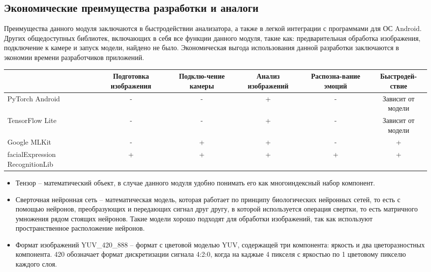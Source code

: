 \documentclass[a4paper,12pt]{article}
\begin{document}
    \subsection{Экономические преимущества разработки и аналоги}
    Преимущества данного модуля заключаются в быстродействии анализатора, а также в легкой интеграции с программами для ОС Android.
    Других общедоступных библиотек, включающих в себя все функции данного модуля, такие как: предварительная обработка изображения, подключение к камере и запуск модели, найдено не было.
    Экономическая выгода использования данной разработки заключаются в экономии времени разработчиков приложений.
    \\

    \noindent
    \begin{tabular}{| l | c | c | c | c | c |}
        \hline
        & \parbox[c][2cm][c]{2.2cm}{\centering Подготовка изображения}
        & \parbox[c][2cm][c]{2.2cm}{\centering Подклю-чение камеры}
        & \parbox[c][2cm][c]{2.2cm}{\centering Анализ изображений}
        & \parbox[c][2cm][c]{2.2cm}{\centering Распозна-вание эмоций}
        & \parbox[c][2cm][c]{2.2cm}{\centering Быстродей-ствие} \\
        \hline
        \parbox[c][1.2cm][c]{3cm}{PyTorch Android} & - & - & + & - & \parbox[c][1.2cm][c]{2.2cm}{\centering Зависит от модели} \\
        \hline
        \parbox[c][1.2cm][c]{3cm}{TensorFlow Lite} & - & - & + & - & \parbox[c][1.2cm][c]{2.2cm}{\centering Зависит от модели} \\
        \hline
        \parbox[c][1.2cm][c]{3cm}{Google MLKit} & - & + & + & - & + \\
        \hline
        \parbox[c][1.2cm][c]{3cm}{facialExpression RecognitionLib} & + & + & + & + & + \\
        \hline
    \end{tabular}

    \newpage
    \renewcommand{\refname}{Список источников}
    \addcontentsline{toc}{section}{\refname}
    
    

    \begin{itemize}
        \item Тензор -- математический объект, в случае данного модуля удобно понимать его как многоиндексный набор компонент.
        \item Сверточная нейронная сеть -- математическая модель, которая работает по принципу биологических нейронных сетей, то есть с помощью нейронов,
            преобразующих и передающих сигнал друг другу, в которой используется операция свертки, то есть матричного умножения рядом стоящих нейронов.
            Такие модели хорошо подходят для обработки изображений, так как используют пространственное расположение нейронов.
        \item Формат изображений YUV\_420\_888 -- формат с цветовой моделью YUV, содержащей три компонента: яркость и два цветоразностных компонента.
            420 обозначает формат дискретизации сигнала 4:2:0, когда на каджые 4 пикселя с яркостью по 1 цветовому пикселю каждого слоя.
    \end{itemize}
\end{document}
